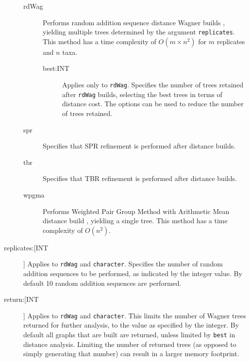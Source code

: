 \begin{description}
\begin{description}
			\item[rdWag] Performs random addition sequence distance Wagner builds 
			\citep{Farris1972,Wheeler2021}, yielding multiple trees determined by the 
			argument \texttt{replicates}. This method has a time complexity of $O(m 
			\times n^2)$ for $m$ replicates and $n$ taxa.
			
			\begin{description}
				
				\item[best:INT] Applies only to \texttt{rdWag}. Specifies the number of trees 
				retained after \texttt{rdWag} builds, selecting the best trees in terms of distance 
				cost. The options can be used to reduce the number of trees retained. 
				
			\end{description}
			
			\item[spr] Specifies that SPR refinement \citep{Dayhoff1969} is performed 
			after distance builds.

			\item[tbr] Specifies that TBR refinement \citep{Farris1988, swofford1990a} 
			is performed after distance builds.
		
			\item[wpgma] Performs Weighted Pair Group Method with Arithmetic Mean 
			distance build \citep{SokalandMichener1958}, yielding a single tree. This method 
			has a time complexity of $O(n^2)$.
			
		\end{description}

		\item [replicates:[INT]] Applies to \texttt{rdWag} and \texttt{character}. Specifies the 
		number of random addition sequences to be performed, as indicated by the integer 
		value. By default 10 random addition sequences are performed.
		
		\item[return:[INT]] Applies to \texttt{rdWag} and \texttt{character}. This limits the 
		number of Wagner trees returned for further analysis, to the value as specified 
		by the integer. By default all graphs that are built are returned, unless limited 
		by \texttt{best} in distance analysis. Limiting the number of returned trees 
		(as opposed to simply generating that number) can result in a larger memory 
		footprint.
			
	\end{description}		

